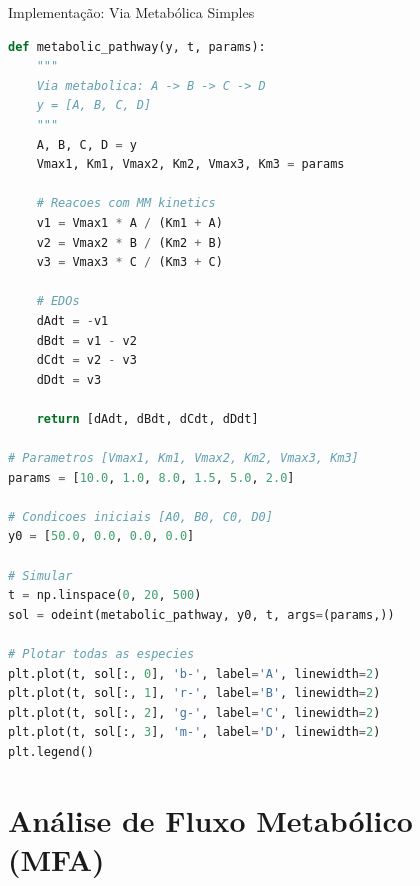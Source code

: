 \begin{frame}[fragile]{Implementação: Via Metabólica Simples}
\begin{lstlisting}[language=Python, caption=Via de três passos, basicstyle=\ttfamily\footnotesize]
def metabolic_pathway(y, t, params):
    """
    Via metabolica: A -> B -> C -> D
    y = [A, B, C, D]
    """
    A, B, C, D = y
    Vmax1, Km1, Vmax2, Km2, Vmax3, Km3 = params

    # Reacoes com MM kinetics
    v1 = Vmax1 * A / (Km1 + A)
    v2 = Vmax2 * B / (Km2 + B)
    v3 = Vmax3 * C / (Km3 + C)

    # EDOs
    dAdt = -v1
    dBdt = v1 - v2
    dCdt = v2 - v3
    dDdt = v3

    return [dAdt, dBdt, dCdt, dDdt]

# Parametros [Vmax1, Km1, Vmax2, Km2, Vmax3, Km3]
params = [10.0, 1.0, 8.0, 1.5, 5.0, 2.0]

# Condicoes iniciais [A0, B0, C0, D0]
y0 = [50.0, 0.0, 0.0, 0.0]

# Simular
t = np.linspace(0, 20, 500)
sol = odeint(metabolic_pathway, y0, t, args=(params,))

# Plotar todas as especies
plt.plot(t, sol[:, 0], 'b-', label='A', linewidth=2)
plt.plot(t, sol[:, 1], 'r-', label='B', linewidth=2)
plt.plot(t, sol[:, 2], 'g-', label='C', linewidth=2)
plt.plot(t, sol[:, 3], 'm-', label='D', linewidth=2)
plt.legend()
\end{lstlisting}
\end{frame}

\section{Análise de Fluxo Metabólico (MFA)}

